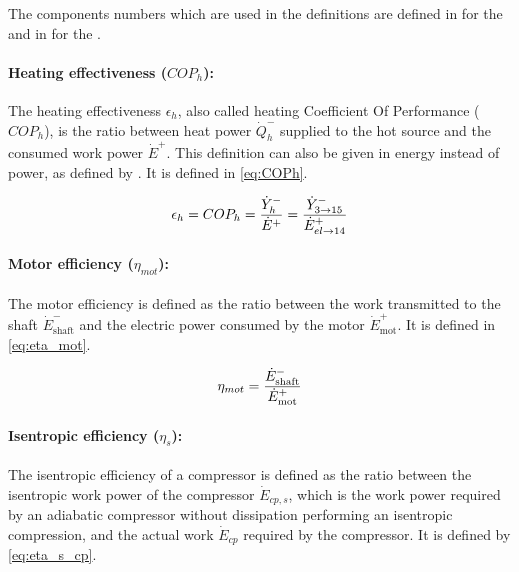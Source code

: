 The components numbers which are used in the definitions are defined
in  for the \AWP{} and in
 for the \BWP{}.

\paragraph{Heating effectiveness ($COP_h$):}

The heating effectiveness $\epsilon_h$, also called heating
Coefficient Of Performance ($COP_h$), is the ratio between heat power
$\dot{Q}^{-}_h$ supplied to the hot source and the consumed work power
$\dot{E}^{+}$. This definition can also be given in energy instead of
power, as defined by \citet[p.\,641]{Borel-Favrat-2010a}. It is
defined in \cref{eq:COPh}.

\begin{equation}
  \label{eq:COPh}
  \epsilon_h = COP_h = \dfrac{\dot{Y}^{-}_h}{\dot{E}^{+}} = \dfrac{\dot{Y}^{-}_{3 \rightarrow 15}}{\dot{E}^{+}_{el \rightarrow 14}}
  \tagaddtextone{$\left[-\right]$}
\end{equation}

\paragraph{Motor efficiency ($\eta_{mot}$):}

The motor efficiency is defined as the ratio between the work
transmitted to the shaft $\dot{E}^-_{\text{shaft}}$ and the electric
power consumed by the motor $\dot{E}^+_{\text{mot}}$. It is defined in
\cref{eq:eta_mot}.

\begin{equation}
  \label{eq:eta_mot}
  \eta_{mot} = \dfrac{\dot{E}^-_{\text{shaft}}}{\dot{E}^+_{\text{mot}}}
  \tagaddtextone{$\left[-\right]$}
\end{equation}


\paragraph{Isentropic efficiency ($\eta_s$):}

The isentropic efficiency of a compressor is defined as the ratio
between the isentropic work power of the compressor $\dot{E}_{cp,s}$,
which is the work power required by an adiabatic compressor without
dissipation performing an isentropic compression, and the actual work
$\dot{E}_{cp}$ required by the compressor. It is defined by
\cref{eq:eta_s_cp}.


